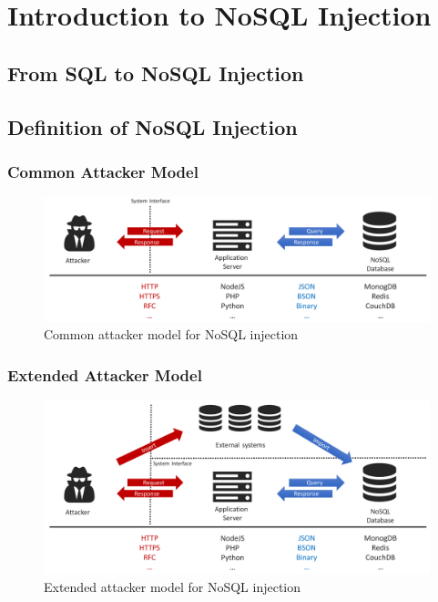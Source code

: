 \chapter{Introduction to NoSQL Injection}

\section{From SQL to NoSQL Injection}

\section{Definition of NoSQL Injection}
\subsection{Common Attacker Model}

\begin{figure}[h]
\centering
  \includegraphics[width=1\linewidth]{Images/attacker_model_normal}
  \caption{Common attacker model for NoSQL injection}
  \label{fig:normalAttackerModel}
\end{figure}


\subsection{Extended Attacker Model}

\begin{figure}[h]
\centering
  \includegraphics[width=1\linewidth]{Images/attacker_model_extended}
  \caption{Extended attacker model for NoSQL injection}
  \label{fig:extendedAttackerModel}
\end{figure}

